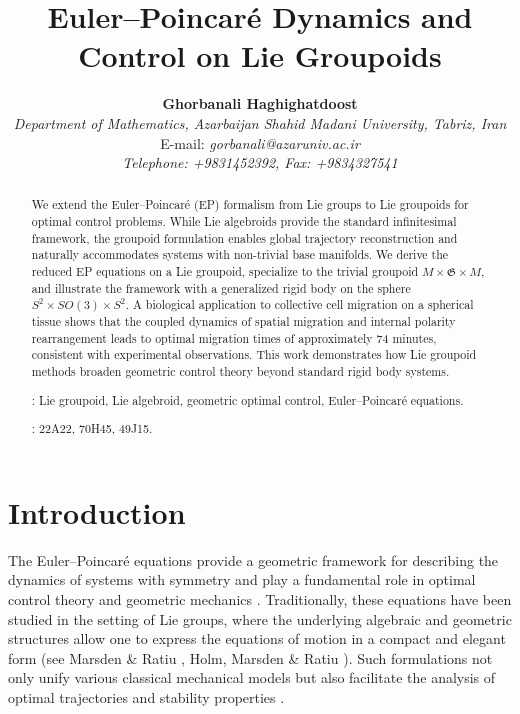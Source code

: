 \documentclass{article}
\begin{document}
\title{\large{\bf Euler--Poincar\'e Dynamics and Control on Lie Groupoids}}

\author{
  \small{\bf Ghorbanali Haghighatdoost}
  \\
  {\small{\em Department of Mathematics, Azarbaijan Shahid Madani University, Tabriz, Iran}}
  \\
  {\small{E-mail: \em gorbanali@azaruniv.ac.ir}}
  \\
  {\small{\em Telephone: +9831452392, Fax: +9834327541}}
}

\maketitle


\begin{abstract}
We extend the Euler--Poincar\'e (EP) formalism from Lie groups to Lie groupoids for optimal control problems. While Lie algebroids provide the standard infinitesimal framework, the groupoid formulation enables global trajectory reconstruction and naturally accommodates systems with non-trivial base manifolds. We derive the reduced EP equations on a Lie groupoid, specialize to the trivial groupoid $M \times \mathfrak{G} \times M$, and illustrate the framework with a generalized rigid body on the sphere $S^2 \times SO(3) \times S^2$. A biological application to collective cell migration on a spherical tissue shows that the coupled dynamics of spatial migration and internal polarity rearrangement leads to optimal migration times of approximately 74 minutes, consistent with experimental observations. This work demonstrates how Lie groupoid methods broaden geometric control theory beyond standard rigid body systems.

: Lie groupoid, Lie algebroid, geometric optimal control, Euler--Poincar\'e equations.

: 22A22, 70H45, 49J15.
\end{abstract}

\section{Introduction}

The Euler--Poincar\'e equations provide a geometric framework for describing the dynamics of systems with symmetry and play a fundamental role in optimal control theory and geometric mechanics \cite{BaWi}. Traditionally, these equations have been studied in the setting of Lie groups, where the underlying algebraic and geometric structures allow one to express the equations of motion in a compact and elegant form (see Marsden \& Ratiu \cite{MarRat}, Holm, Marsden \& Ratiu \cite{HolMarRat}). Such formulations not only unify various classical mechanical models but also facilitate the analysis of optimal trajectories and stability properties \cite{Bloch}.
\end{document}
